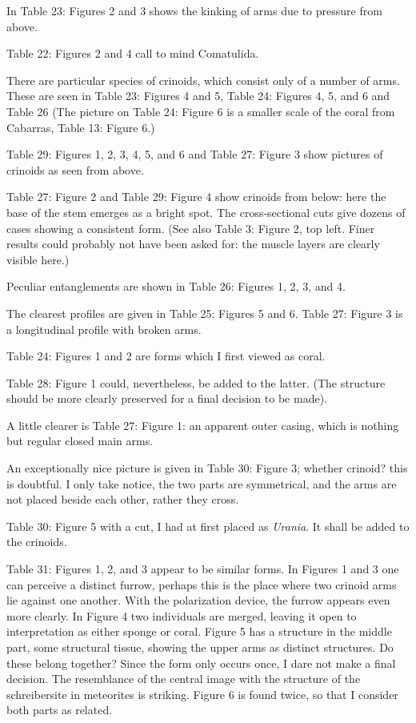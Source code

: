 \documentclass[a4paper, 12pt, oneside]{article}
\begin{document}
In Table 23: Figures 2 and 3 shows the kinking of arms due to pressure from above.

Table 22: Figures 2 and 4 call to mind Comatulida.

There are particular species of crinoids, which consist only of a number of arms. These are seen in Table 23: Figures 4 and 5, Table 24: Figures 4, 5, and 6 and Table 26 (The picture on Table 24: Figure 6 is a smaller scale of the coral from Cabarras, Table 13: Figure 6.)

Table 29: Figures 1, 2, 3, 4, 5, and 6 and Table 27: Figure 3 show pictures of crinoids as seen from above.

Table 27: Figure 2 and Table 29: Figure 4 show crinoids from below: here the base of the stem emerges as a bright spot. The cross-sectional cuts give dozens of cases showing a consistent form. (See also Table 3: Figure 2, top left. Finer results could probably not have been asked for: the muscle layers are clearly visible here.)

Peculiar entanglements are shown in Table 26: Figures 1, 2, 3, and 4.

The clearest profiles are given in Table 25: Figures 5 and 6. Table 27: Figure 3 is a longitudinal profile with broken arms.

Table 24: Figures 1 and 2 are forms which I first viewed as coral.

Table 28: Figure 1 could, nevertheless, be added to the latter. (The structure should be more clearly preserved for a final decision to be made).

A little clearer is Table 27: Figure 1: an apparent outer casing, which is nothing but regular closed main arms.

An exceptionally nice picture is given in Table 30: Figure 3; whether crinoid? this is doubtful. I only take notice, the two parts are symmetrical, and the arms are not placed beside each other, rather they cross.

Table 30: Figure 5 with a cut, I had at first placed as \emph{Urania}. It shall be added to the crinoids.

Table 31: Figures 1, 2, and 3 appear to be similar forms. In Figures 1 and 3 one can perceive a distinct furrow, perhaps this is the place where two crinoid arms lie against one another. With the polarization device, the furrow appears even more clearly. In Figure 4 two individuals are merged, leaving it open to interpretation as either sponge or coral. Figure 5 has a structure in the middle part, some structural tissue, showing the upper arms as distinct structures. Do these belong together? Since the form only occurs once, I dare not make a final decision. The resemblance of the central image with the structure of the schreibersite in meteorites is striking. Figure 6 is found twice, so that I consider both parts as related.
\end{document}
